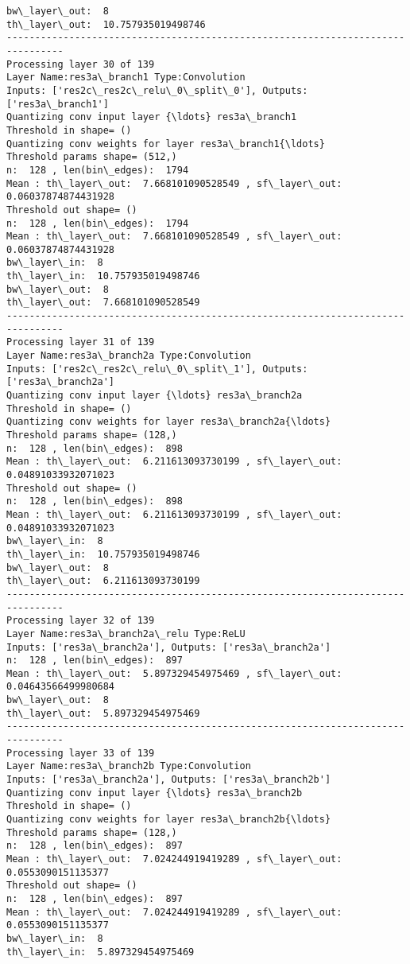 \documentclass[11pt]{article}
\begin{document}
\begin{Verbatim}[commandchars=\\\{\}]
bw\_layer\_out:  8
th\_layer\_out:  10.757935019498746
--------------------------------------------------------------------------------
Processing layer 30 of 139
Layer Name:res3a\_branch1 Type:Convolution
Inputs: ['res2c\_res2c\_relu\_0\_split\_0'], Outputs: ['res3a\_branch1']
Quantizing conv input layer {\ldots} res3a\_branch1
Threshold in shape= ()
Quantizing conv weights for layer res3a\_branch1{\ldots}
Threshold params shape= (512,)
n:  128 , len(bin\_edges):  1794
Mean : th\_layer\_out:  7.668101090528549 , sf\_layer\_out:  0.06037874874431928
Threshold out shape= ()
n:  128 , len(bin\_edges):  1794
Mean : th\_layer\_out:  7.668101090528549 , sf\_layer\_out:  0.06037874874431928
bw\_layer\_in:  8
th\_layer\_in:  10.757935019498746
bw\_layer\_out:  8
th\_layer\_out:  7.668101090528549
--------------------------------------------------------------------------------
Processing layer 31 of 139
Layer Name:res3a\_branch2a Type:Convolution
Inputs: ['res2c\_res2c\_relu\_0\_split\_1'], Outputs: ['res3a\_branch2a']
Quantizing conv input layer {\ldots} res3a\_branch2a
Threshold in shape= ()
Quantizing conv weights for layer res3a\_branch2a{\ldots}
Threshold params shape= (128,)
n:  128 , len(bin\_edges):  898
Mean : th\_layer\_out:  6.211613093730199 , sf\_layer\_out:  0.04891033932071023
Threshold out shape= ()
n:  128 , len(bin\_edges):  898
Mean : th\_layer\_out:  6.211613093730199 , sf\_layer\_out:  0.04891033932071023
bw\_layer\_in:  8
th\_layer\_in:  10.757935019498746
bw\_layer\_out:  8
th\_layer\_out:  6.211613093730199
--------------------------------------------------------------------------------
Processing layer 32 of 139
Layer Name:res3a\_branch2a\_relu Type:ReLU
Inputs: ['res3a\_branch2a'], Outputs: ['res3a\_branch2a']
n:  128 , len(bin\_edges):  897
Mean : th\_layer\_out:  5.897329454975469 , sf\_layer\_out:  0.04643566499980684
bw\_layer\_out:  8
th\_layer\_out:  5.897329454975469
--------------------------------------------------------------------------------
Processing layer 33 of 139
Layer Name:res3a\_branch2b Type:Convolution
Inputs: ['res3a\_branch2a'], Outputs: ['res3a\_branch2b']
Quantizing conv input layer {\ldots} res3a\_branch2b
Threshold in shape= ()
Quantizing conv weights for layer res3a\_branch2b{\ldots}
Threshold params shape= (128,)
n:  128 , len(bin\_edges):  897
Mean : th\_layer\_out:  7.024244919419289 , sf\_layer\_out:  0.0553090151135377
Threshold out shape= ()
n:  128 , len(bin\_edges):  897
Mean : th\_layer\_out:  7.024244919419289 , sf\_layer\_out:  0.0553090151135377
bw\_layer\_in:  8
th\_layer\_in:  5.897329454975469

\end{Verbatim}
\end{document}
